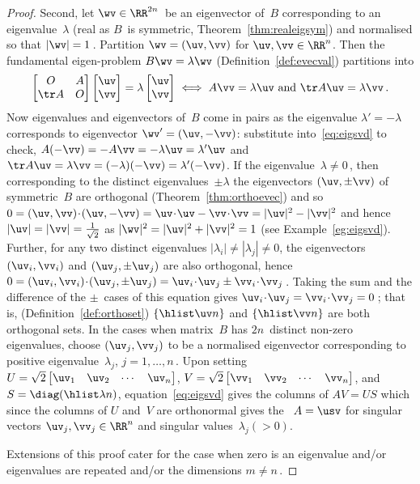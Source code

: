\begin{proof}
Second, let \(\wv\in\RR^{2n}\)\ be an eigenvector of~\(B\) corresponding to an eigenvalue~\(\lambda\) (real as \(B\)~is symmetric, Theorem~\ref{thm:realeigsym}) and normalised so that \(|\wv|=1\)\,.
Partition \(\wv=(\uv,\vv)\) for \(\uv,\vv\in\RR^n\).
Then the fundamental eigen-problem \(B\wv=\lambda\wv\)  (Definition~\ref{def:evecval}) partitions into
\begin{equation}
\begin{bmatrix} O& A\\\tr A&O \end{bmatrix}\begin{bmatrix} \uv\\\vv \end{bmatrix}=\lambda\begin{bmatrix} \uv\\\vv \end{bmatrix}
\iff  A\vv=\lambda\uv \text{ and }\tr A\uv=\lambda\vv\,.
\label{eq:eigsvd}
\end{equation}
Now eigenvalues and eigenvectors of~\(B\) come in pairs as  the eigenvalue \(\lambda'=-\lambda\) corresponds to eigenvector \(\wv'=(\uv,-\vv)\): substitute into~\eqref{eq:eigsvd} to check, \(A(-\vv)=-A\vv=-\lambda\uv=\lambda'\uv\) and \(\tr A\uv=\lambda\vv=(-\lambda)(-\vv)=\lambda'(-\vv)\).
If the eigenvalue~\(\lambda\neq0\)\,, then corresponding to the distinct eigenvalues~\(\pm\lambda\) the eigenvectors \((\uv,\pm\vv)\) of symmetric~\(B\) are orthogonal (Theorem~\ref{thm:orthoevec}) and so \(0=(\uv,\vv)\cdot(\uv,-\vv)=\uv\cdot\uv-\vv\cdot\vv=|\uv|^2-|\vv|^2\) and hence \(|\uv|=|\vv|=\frac1{\sqrt2}\) as \(|\wv|^2=|\uv|^2+|\vv|^2=1\) (see Example~\ref{eg:eigsvd}).
Further, for any two distinct eigenvalues \(|\lambda_i|\neq|\lambda_j|\neq 0\), the eigenvectors \((\uv_i,\vv_i)\) and \((\uv_j,\pm\uv_j)\) are also orthogonal, hence \(0 =(\uv_i,\vv_i)\cdot(\uv_j,\pm\uv_j) =\uv_i\cdot\uv_j \pm\vv_i\cdot\vv_j\)\,.
Taking the sum and the difference of the \(\pm\)~cases of this equation gives \(\uv_i\cdot\uv_j=\vv_i\cdot\vv_j=0\)\,; that is,  (Definition~\ref{def:orthoset}) \(\{\hlist\uv n\}\) and \(\{\hlist\vv n\}\) are both orthogonal sets.
In the cases when matrix~\(B\) has \(2n\)~distinct non-zero eigenvalues, choose \((\uv_j,\vv_j)\) to be a normalised eigenvector corresponding to positive eigenvalue~\(\lambda_j\), \(j=1,\ldots,n\)\,. 
Upon setting \(U=\sqrt2\begin{bmatrix} \uv_1&\uv_2&\cdots&\uv_n \end{bmatrix}\), \(V=\sqrt2\begin{bmatrix} \vv_1&\vv_2&\cdots&\vv_n \end{bmatrix}\), and \(S=\diag(\hlist\lambda n)\), equation~\eqref{eq:eigsvd} gives the columns of \(AV=US\) which since the columns of \(U\) and~\(V\) are orthonormal gives the \svd\ \(A=\usv\) for singular vectors \(\uv_j,\vv_j\in\RR^n\) and singular values~\(\lambda_j(>0)\).

Extensions of this proof cater for the case when zero is an eigenvalue and/or eigenvalues are repeated and/or the dimensions \(m\neq n\)\,.
\end{proof}

